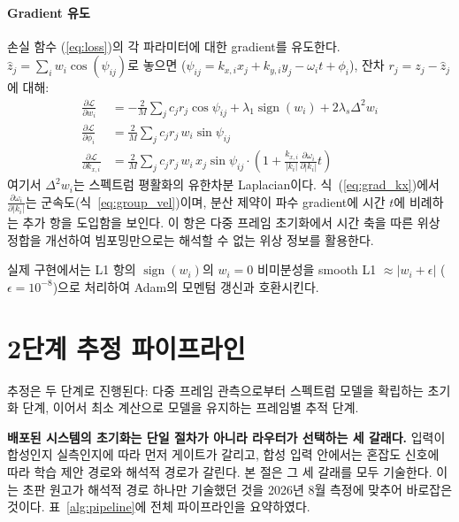 \documentclass[11pt]{report}
\numberwithin{equation}{chapter}
\numberwithin{figure}{chapter}
\numberwithin{table}{chapter}
\begin{document}
\paragraph{Gradient 유도}
손실 함수 (\ref{eq:loss})의 각 파라미터에 대한 gradient를 유도한다.
$\hat{z}_j = \sum_{i} w_i \cos(\psi_{ij})$로 놓으면
($\psi_{ij} = k_{x,i}x_j + k_{y,i}y_j - \omega_i t + \phi_i$),
잔차 $r_j = z_j - \hat{z}_j$에 대해:
\begin{align}
  \frac{\partial\mathcal{L}}{\partial w_i} &=
    -\frac{2}{M}\sum_{j} c_j r_j \cos\psi_{ij}
    + \lambda_1 \operatorname{sign}(w_i)
    + 2\lambda_s \Delta^2 w_i
  \label{eq:grad_w} \\
  \frac{\partial\mathcal{L}}{\partial \phi_i} &=
    \frac{2}{M}\sum_{j} c_j r_j \, w_i \sin\psi_{ij}
  \label{eq:grad_phi} \\
  \frac{\partial\mathcal{L}}{\partial k_{x,i}} &=
    \frac{2}{M}\sum_{j} c_j r_j \, w_i \, x_j \sin\psi_{ij}
    \cdot \left(1 + \frac{k_{x,i}}{|k_i|}\frac{\partial\omega_i}{\partial|k_i|} t\right)
  \label{eq:grad_kx}
\end{align}
여기서 $\Delta^2 w_i$는 스펙트럼 평활화의 유한차분 Laplacian이다.
식~(\ref{eq:grad_kx})에서 $\frac{\partial\omega_i}{\partial|k_i|}$는
군속도(식~\ref{eq:group_vel})이며,
분산 제약이 파수 gradient에 시간 $t$에 비례하는 추가 항을 도입함을 보인다.
이 항은 다중 프레임 초기화에서 시간 축을 따른 위상 정합을 개선하여
빔포밍만으로는 해석할 수 없는 위상 정보를 활용한다.

실제 구현에서는 L1 항의 $\operatorname{sign}(w_i)$의 $w_i=0$ 비미분성을
smooth L1 $\approx |w_i + \epsilon|$ ($\epsilon=10^{-8}$)으로 처리하여
Adam의 모멘텀 갱신과 호환시킨다.

\section{2단계 추정 파이프라인}
\label{sec:pipeline}

추정은 두 단계로 진행된다: 다중 프레임 관측으로부터 스펙트럼 모델을 확립하는
초기화 단계, 이어서 최소 계산으로 모델을 유지하는 프레임별 추적 단계.

\textbf{배포된 시스템의 초기화는 단일 절차가 아니라 라우터가 선택하는 세 갈래다.}
입력이 합성인지 실측인지에 따라 먼저 게이트가 갈리고, 합성 입력 안에서는 혼잡도 신호에 따라
학습 제안 경로와 해석적 경로가 갈린다. 본 절은 그 세 갈래를 모두 기술한다.
이는 초판 원고가 해석적 경로 하나만 기술했던 것을 2026년 8월 측정에 맞추어 바로잡은 것이다.
표~\ref{alg:pipeline}에 전체 파이프라인을 요약하였다.
\end{document}
